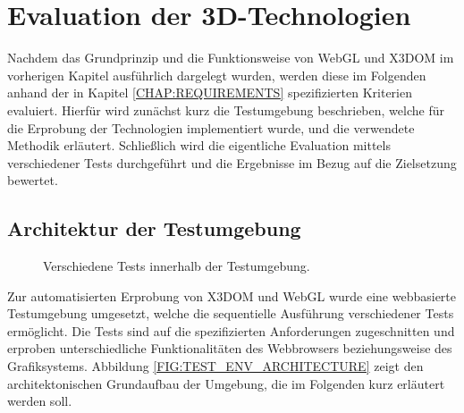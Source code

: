 \chapter{Evaluation der 3D-Technologien}
\label{CHAP:EVALUATION}

Nachdem das Grundprinzip und die Funktionsweise von WebGL und X3DOM im vorherigen Kapitel ausführlich dargelegt wurden, werden diese im Folgenden anhand der in Kapitel \ref{CHAP:REQUIREMENTS} spezifizierten Kriterien evaluiert.
Hierfür wird zunächst kurz die Testumgebung beschrieben, welche für die Erprobung der Technologien implementiert wurde, und die verwendete Methodik erläutert. Schließlich wird die eigentliche Evaluation mittels verschiedener Tests durchgeführt und die Ergebnisse im Bezug auf die Zielsetzung bewertet.

\section{Architektur der Testumgebung}

\begin{figure}[htb]
	\centering
	\hfill
	\caption{Verschiedene Tests innerhalb der Testumgebung.}
	\label{FIG:WEB3D_TEST_ENV}
\end{figure}

Zur automatisierten Erprobung von X3DOM und WebGL wurde eine webbasierte Testumgebung umgesetzt, welche die sequentielle Ausführung verschiedener Tests ermöglicht. Die Tests sind auf die spezifizierten Anforderungen zugeschnitten und erproben unterschiedliche Funktionalitäten des Webbrowsers beziehungsweise des Grafiksystems. Abbildung \ref{FIG:TEST_ENV_ARCHITECTURE} zeigt den architektonischen Grundaufbau der Umgebung, die im Folgenden kurz erläutert werden soll.

